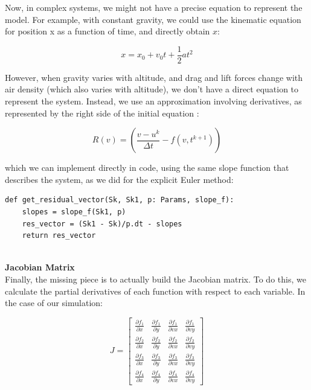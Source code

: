 \documentclass[runningheads]{llncs}
\begin{document}
Now, in complex systems, we might not have a precise equation to represent the model. For example, with constant gravity, we could use the kinematic equation for position x as a function of time, and directly obtain \( x \):

\begin{equation}
x = x_0 + v_0 t + \frac{1}{2} a t^2
\end{equation}

However, when gravity varies with altitude, and drag and lift forces change with air density (which also varies with altitude), we don't have a direct equation to represent the system. Instead, we use an approximation involving derivatives, as represented by the right side of the initial equation \cite{newton_raphson_method}:

\begin{equation}
R(v) = \left( \frac{v - u^k}{\Delta t} - f(v, t^{k+1}) \right)
\end{equation}

\noindent which we can implement directly in code, using the same slope function that describes the system, as we did for the explicit Euler method:

\begin{verbatim}
def get_residual_vector(Sk, Sk1, p: Params, slope_f):
    slopes = slope_f(Sk1, p) 
    res_vector = (Sk1 - Sk)/p.dt - slopes
    return res_vector
\end{verbatim}


\textbf{\\Jacobian Matrix\\}
Finally, the missing piece is to actually build the Jacobian matrix. To do this, we calculate the partial derivatives of each function with respect to each variable. In the case of our simulation: 

\[
J = \begin{bmatrix}
        \frac{\partial f_1}{\partial x} & \frac{\partial f_1}{\partial y} & \frac{\partial f_1}{\partial vx} & \frac{\partial f_1}{\partial vy} \\
        \frac{\partial f_2}{\partial x} & \frac{\partial f_2}{\partial y} & \frac{\partial f_2}{\partial vx} & \frac{\partial f_2}{\partial vy} \\
        \frac{\partial f_3}{\partial x} & \frac{\partial f_3}{\partial y} & \frac{\partial f_3}{\partial vx} & \frac{\partial f_3}{\partial vy} \\
        \frac{\partial f_4}{\partial x} & \frac{\partial f_4}{\partial y} & \frac{\partial f_4}{\partial vx} & \frac{\partial f_4}{\partial vy}
    \end{bmatrix}
\]
\end{document}
